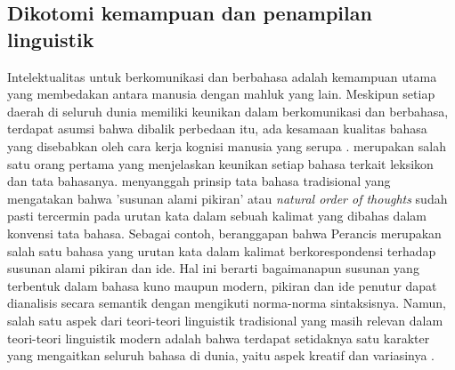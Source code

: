 \subsection{Dikotomi kemampuan dan penampilan linguistik}
Intelektualitas untuk berkomunikasi dan berbahasa adalah kemampuan utama yang membedakan antara manusia dengan mahluk yang lain. Meskipun setiap daerah di seluruh dunia memiliki keunikan dalam berkomunikasi dan berbahasa, terdapat asumsi bahwa dibalik perbedaan itu, ada  kesamaan kualitas bahasa yang disebabkan oleh cara kerja kognisi manusia yang serupa \citep{sapir1921intro, chomsky1965syntactic}. \cite{beattie1788theory} merupakan salah satu orang pertama yang menjelaskan keunikan setiap bahasa terkait leksikon dan tata bahasanya. \cite{chomsky1965syntactic} menyanggah prinsip tata bahasa tradisional yang mengatakan bahwa 'susunan alami pikiran' atau \textit{natural order of thoughts} sudah pasti tercermin pada urutan kata dalam sebuah kalimat yang dibahas dalam konvensi tata bahasa. Sebagai contoh, \cite{diderot1751lettre} beranggapan bahwa Perancis merupakan salah satu bahasa yang urutan kata dalam kalimat berkorespondensi terhadap susunan alami pikiran dan ide. Hal ini berarti bagaimanapun susunan yang terbentuk dalam bahasa kuno maupun modern, pikiran dan ide penutur dapat dianalisis secara semantik dengan mengikuti norma-norma sintaksisnya. Namun, salah satu aspek dari teori-teori linguistik tradisional yang masih relevan dalam teori-teori linguistik modern adalah bahwa terdapat setidaknya satu karakter yang mengaitkan seluruh bahasa di dunia, yaitu aspek kreatif dan variasinya \citep{hawkins2014cross}.

